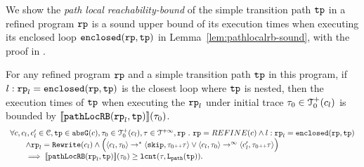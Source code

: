 We show the \emph{path local reachability-bound} of the simple transition path $\mathtt{tp}$ in a refined program $\mathtt{rp}$ is a sound upper bound of its execution times when executing its enclosed loop $\mathtt{enclosed}(\mathtt{rp}, \mathtt{tp})$ in Lemma~\ref{lem:pathlocalrb-sound}, with the proof in .
\begin{lem}
  \label{lem:pathlocalrb-sound}
  For any refined program $\mathtt{rp}$ and a simple transition path $\mathtt{tp}$ in this program,
  if $l: \mathtt{rp}_l = \mathtt{enclosed}(\mathtt{rp}, \mathtt{tp})$ is the closest loop where $\mathtt{tp}$ is nested,
  then the execution times of $\mathtt{tp}$ when executing the $\mathtt{rp}_l$ under initial trace $\mathtt{\tau}_0 \in \mathcal{T}^{+}_0(c_l)$ is bounded by $\llbracket \mathtt{pathLocRB}(\mathtt{rp}_l, \mathtt{tp}) \rrbracket(\mathtt{\tau}_0)$.
  \[
    \begin{array}{l}
    \forall c, c_l, c_l' \in \mathcal{C}, \mathtt{tp} \in \mathtt{abs}{\mathtt{G}}(c), \mathtt{\tau}_0 \in \mathcal{T}^{+}_0(c_l), \mathtt{\tau} \in \mathcal{T}^{+\infty}, \mathtt{rp} ~.~ 
    \mathtt{rp} = REFINE(c)
    \land
    l: \mathtt{rp}_l = \mathtt{enclosed}(\mathtt{rp}, \mathtt{tp})
    \\ \qquad
    \land 
    \mathtt{rp}_l = \mathtt{Rewrite}(c_l)
    \land
    \Big(
    \langle c_l, \mathtt{\tau}_0 \rangle \to^* \langle \mathtt{skip}, \mathtt{\tau}_0 {\scriptscriptstyle ++} \mathtt{\tau} \rangle
    \lor \langle c_l, \mathtt{\tau}_0 \rangle \to^\infty \langle c_l', \mathtt{\tau}_0 {\scriptscriptstyle ++} \mathtt{\tau} \rangle 
    \Big)
    \\ \qquad
    \implies
    \llbracket \mathtt{pathLocRB}(\mathtt{rp}_l, \mathtt{tp}) \rrbracket(\mathtt{\tau}_0) \geq \mathtt{lcnt}(\mathtt{\tau}, \mathtt{L}_{\mathtt{path}}(\mathtt{tp})).
    \end{array}
  \]  
\end{lem}